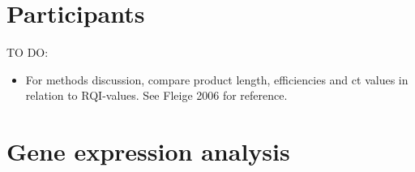 \documentclass[twoside,10pt]{gihclass} %
\providecommand{\tightlist}{%
  \setlength{\itemsep}{0pt}\setlength{\parskip}{0pt}}
\begin{document}
\hypertarget{participants}{%
\section{Participants}\label{participants}}

TO DO:
\begin{itemize}
\tightlist
\item
  For methods discussion, compare product length, efficiencies and ct values in relation to RQI-values. See Fleige 2006 for reference.
\end{itemize}
\hypertarget{gene-expression-analysis}{%
\section{Gene expression analysis}\label{gene-expression-analysis}}
\end{document}
